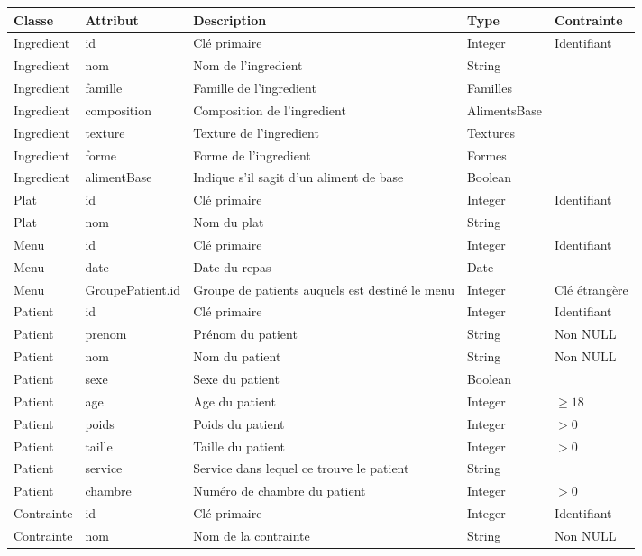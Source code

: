 \begin{table}
\begin{tabular}{llp{5cm}ll}
  \hline
  \textbf{Classe} & \textbf{Attribut} & \textbf{Description} & \textbf{Type} & \textbf{Contrainte} \\ \hline
  Ingredient & id & Clé primaire & Integer & Identifiant \\
  Ingredient & nom & Nom de l'ingredient & String & \\
  Ingredient & famille & Famille de l'ingredient & Familles & \\
  Ingredient & composition & Composition de l'ingredient & AlimentsBase & \\
  Ingredient & texture & Texture de l'ingredient & Textures & \\
  Ingredient & forme & Forme de l'ingredient & Formes & \\
  Ingredient & alimentBase & Indique s'il sagit d'un aliment de base & Boolean & \\ \hline
  Plat & id & Clé primaire & Integer & Identifiant \\
  Plat & nom & Nom du plat & String & \\ \hline
  Menu & id & Clé primaire & Integer & Identifiant \\
  Menu & date & Date du repas & Date & \\
  Menu & GroupePatient.id &  Groupe de patients auquels est destiné le menu & Integer & Clé étrangère \\ \hline
  Patient & id & Clé primaire & Integer & Identifiant \\
  Patient & prenom & Prénom du patient & String & Non NULL\\
  Patient & nom & Nom du patient & String & Non NULL\\
  Patient & sexe & Sexe du patient & Boolean & \\
  Patient & age & Age du patient & Integer & $\geqslant 18$\\ %
  Patient & poids & Poids du patient & Integer & $> 0$ \\
  Patient & taille & Taille du patient & Integer & $> 0$ \\
  Patient & service & Service dans lequel ce trouve le patient & String & \\
  Patient & chambre & Numéro de chambre du patient & Integer & $> 0$ \\ \hline
  Contrainte & id & Clé primaire & Integer & Identifiant \\
  Contrainte & nom & Nom de la contrainte & String & Non NULL \\

\end{tabular}
\end{table}
